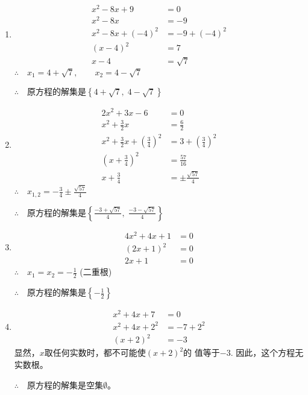\begin{solution}
\begin{enumerate}
    \item \begin{align*}
        x^2-8x+9&=0\\
        x^2-8x&=-9\tag{移项}\\
        x^2-8x+(-4)^2&=-9+(-4)^2 \tag{配方}\\
        (x-4)^2&=7\\
        x-4&=\sqrt{7} \tag{平方根的意义}
    \end{align*}
$\therefore\quad x_1=4+\sqrt{7},\qquad x_2=4-\sqrt{7}$

$\therefore\quad $原方程的解集是$\left\{4+\sqrt{7},\; 4-\sqrt{7}\right\}$
    \item \begin{align*}
        2x^2+3x-6&=0\\
x^2+\frac{3}{2}x&=\frac{6}{2}\\
x^2+\frac{3}{2}x+\left(\frac{3}{4}\right)^2&=3+\left(\frac{3}{4}\right)^2\\
\left(x+\frac{3}{4}\right)^2&=\frac{57}{16}\\
x+\frac{3}{4}&=\pm\frac{\sqrt{57}}{4}
    \end{align*}
    $\therefore\quad x_{1,2}=-\frac{3}{4}\pm \frac{\sqrt{57}}{4}$

$\therefore\quad $原方程的解集是$\left\{\frac{-3+\sqrt{57}}{4},\; \frac{-3-\sqrt{57}}{4} \right\}$
    \item \begin{align*}
            4x^2+4x+1&=0\\
            (2x+1)^2&=0\\
            2x+1&=0
    \end{align*}
    $\therefore\quad x_{1}=x_2=-\frac{1}{2}$ (二重根)

$\therefore\quad $原方程的解集是$\left\{-\frac{1}{2}\right\}$
    \item \begin{align*}
        x^2+4x+7&=0\\
        x^2+4x+2^2&=-7+2^2\\
(x+2)^2&=-3
    \end{align*}
    显然，$x$取任何实数时，都不可能使$(x+2)^2$的
值等于$-3$. 因此，这个方程无实数根。

$\therefore\quad$原方程的解集是空集$\emptyset$。

\end{enumerate}
\end{solution}

